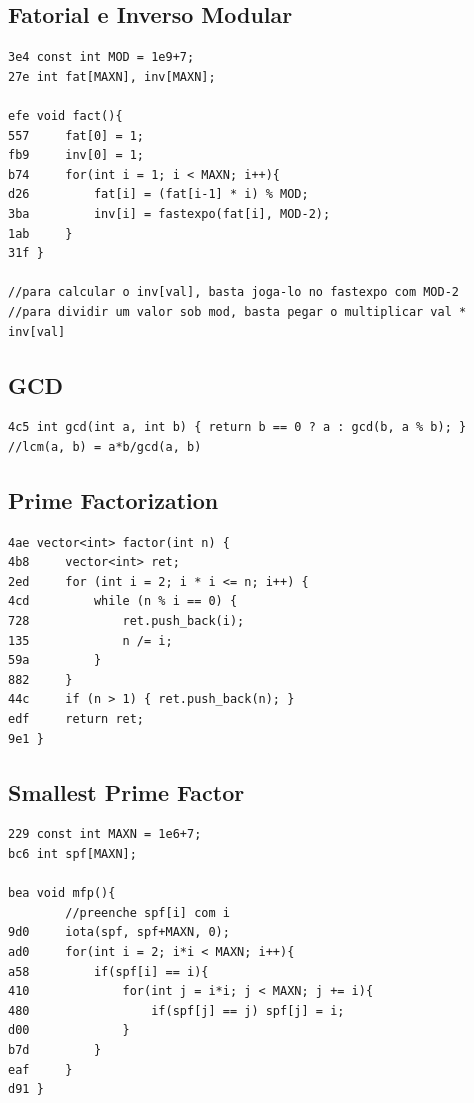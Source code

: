 \documentclass[11pt, a4paper, twoside]{article}
\begin{document}
\subsection{Fatorial e Inverso Modular}
\begin{lstlisting}
3e4 const int MOD = 1e9+7;
27e int fat[MAXN], inv[MAXN];

efe void fact(){
557     fat[0] = 1;
fb9     inv[0] = 1;
b74     for(int i = 1; i < MAXN; i++){
d26         fat[i] = (fat[i-1] * i) % MOD;
3ba         inv[i] = fastexpo(fat[i], MOD-2);
1ab     }
31f }

//para calcular o inv[val], basta joga-lo no fastexpo com MOD-2
//para dividir um valor sob mod, basta pegar o multiplicar val * inv[val]
\end{lstlisting}

\subsection{GCD}
\begin{lstlisting}
4c5 int gcd(int a, int b) { return b == 0 ? a : gcd(b, a % b); }
//lcm(a, b) = a*b/gcd(a, b)
\end{lstlisting}

\subsection{Prime Factorization}
\begin{lstlisting}
4ae vector<int> factor(int n) {
4b8 	vector<int> ret;
2ed 	for (int i = 2; i * i <= n; i++) {
4cd 		while (n % i == 0) {
728 			ret.push_back(i);
135 			n /= i;
59a 		}
882 	}
44c 	if (n > 1) { ret.push_back(n); }
edf 	return ret;
9e1 }
\end{lstlisting}

\subsection{Smallest Prime Factor}
\begin{lstlisting}
229 const int MAXN = 1e6+7;
bc6 int spf[MAXN];

bea void mfp(){
        //preenche spf[i] com i
9d0     iota(spf, spf+MAXN, 0);
ad0     for(int i = 2; i*i < MAXN; i++){
a58         if(spf[i] == i){
410             for(int j = i*i; j < MAXN; j += i){
480                 if(spf[j] == j) spf[j] = i;
d00             }
b7d         }
eaf     }
d91 }
\end{lstlisting}
\end{document}
